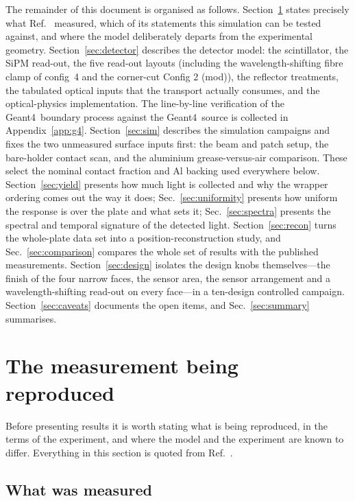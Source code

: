 \documentclass[11pt,a4paper]{article}
\newcommand{\gfour}{Geant4}
\begin{document}
The remainder of this document is organised as follows.
Section~\ref{sec:measurement} states precisely what Ref.~\cite{Rao2025}
measured, which of its statements this simulation can be tested against, and
where the model deliberately departs from the experimental geometry.
Section~\ref{sec:detector} describes the detector model: the scintillator,
the SiPM read-out, the five read-out layouts (including the
wavelength-shifting fibre clamp of config~4 and the corner-cut Config 2
(mod)), the reflector treatments, the
tabulated optical inputs that the transport actually consumes, and the
optical-physics implementation. The line-by-line verification of the
\gfour\ boundary process against the \gfour\ source is collected in
Appendix~\ref{app:g4}.
Section~\ref{sec:sim} describes the simulation campaigns and fixes the two
unmeasured surface inputs first: the beam and patch setup, the bare-holder
contact scan, and the aluminium grease-versus-air comparison. These select
the nominal contact fraction and Al backing used everywhere below.
Section~\ref{sec:yield} presents how much light is collected and why the
wrapper ordering comes out the way it does;
Sec.~\ref{sec:uniformity} presents how uniform the response is over the
plate and what sets it; Sec.~\ref{sec:spectra} presents the spectral and
temporal signature of the detected light.
Section~\ref{sec:recon} turns the whole-plate data set into a
position-reconstruction study, and Sec.~\ref{sec:comparison} compares the
whole set of results with the published measurements.
Section~\ref{sec:design} isolates the design knobs themselves---the finish of
the four narrow faces, the sensor area, the sensor arrangement and a
wavelength-shifting read-out on every face---in a ten-design controlled
campaign.
Section~\ref{sec:caveats} documents the open items, and
Sec.~\ref{sec:summary} summarises.

\section{The measurement being reproduced}
\label{sec:measurement}

Before presenting results it is worth stating what is being reproduced, in
the terms of the experiment, and where the model and the experiment are
known to differ. Everything in this section is quoted from
Ref.~\cite{Rao2025}.

\subsection{What was measured}
\end{document}
